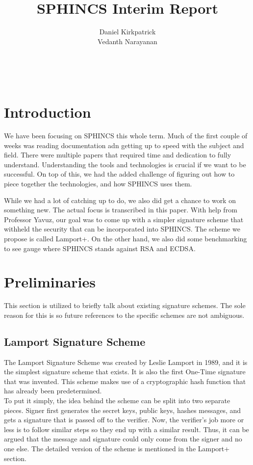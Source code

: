\documentclass[]{scrartcl}
\title{SPHINCS Interim Report}
\author{Daniel Kirkpatrick\\Vedanth Narayanan}
\makeatletter
\renewcommand{\maketitle}{ %
	\begin{center} %
		{\LARGE\@title} %
		
		\vspace{15pt} %
		{\large\@author} %
		\\\@date %
		
	\end{center}
}
\makeatother
\begin{document}
\maketitle

\section*{Introduction}
We have been focusing on SPHINCS this whole term. Much of the first couple of weeks was reading documentation adn getting up to speed with the subject and field. There were multiple papers that required time and dedication to fully understand. Understanding the tools and technologies is crucial if we want to be successful. On top of this, we had the added challenge of figuring out how to piece together the technologies, and how SPHINCS uses them.

While we had a lot of catching up to do, we also did get a chance to work on something new. The actual focus is transcribed in this paper. With help from Professor Yavuz, our goal was to come up with a simpler signature scheme that withheld the security that can be incorporated into SPHINCS. The scheme we propose is called Lamport+. On the other hand, we also did some benchmarking to see gauge where SPHINCS stands against RSA and ECDSA.

\section*{Preliminaries}
\vspace{-0.3cm}This section is utilized to briefly talk about existing signature schemes. The sole reason for this is so future references to the specific schemes are not ambiguous. 

\subsection*{Lamport Signature Scheme}
The Lamport Signature Scheme was created by Leslie Lamport in 1989, and it is the simplest signature scheme that exists. It is also the first One-Time signature that was invented. This scheme makes use of a cryptographic hash function that has already been predetermined.\\
To put it simply, the idea behind the scheme can be split into two separate pieces. Signer first generates the secret keys, public keys, hashes messages, and gets a signature that is passed off to the verifier. Now, the verifier's job more or less is to follow similar steps so they end up with a similar result. Thus, it can be argued that the message and signature could only come from the signer and no one else. The detailed version of the scheme is mentioned in the Lamport+ section.
\end{document}
